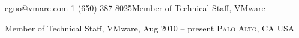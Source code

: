 \documentclass[10pt,letterpaper]{article}
\begin{document}
 



\noindent\href{mailto:cguo@vmware.com}{cguo@vmare.com}\bull
\textsmaller{+}1 (650) 387-8025\bull Member of Technical Staff, VMware

\spacedhrule{0.9em}{-0.4em} %



\headedsection
{Member of Technical Staff, VMware, Aug 2010 -- present}
{\textsc{Palo Alto, CA USA}} {

}
\end{document}
